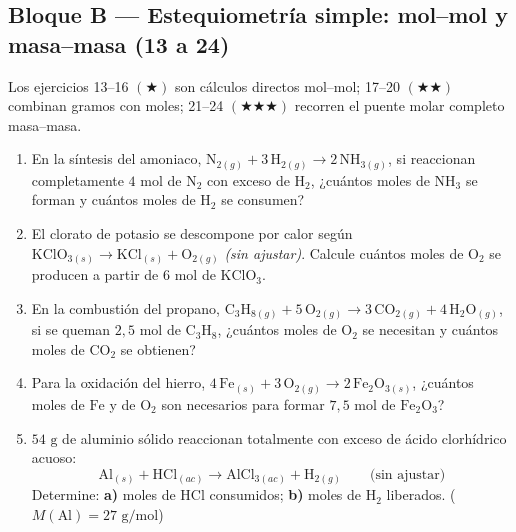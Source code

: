 \documentclass[12pt, letterpaper]{article}
\begin{document}
\subsection{Bloque B — Estequiometría simple: mol--mol y masa--masa (13 a 24)}

\noindent Los ejercicios 13--16 $(\bigstar)$ son cálculos directos mol--mol; 17--20 $(\bigstar\bigstar)$ combinan gramos con moles; 21--24 $(\bigstar\bigstar\bigstar)$ recorren el puente molar completo masa--masa.

\begin{enumerate}[leftmargin=*, start=13]

  \item \facil{}\hspace{0.55em}En la síntesis del amoniaco, $\text{N}_{2(g)} + 3\,\text{H}_{2(g)} \longrightarrow 2\,\text{NH}_{3(g)}$, si reaccionan completamente $4\text{ mol}$ de $\text{N}_2$ con exceso de $\text{H}_2$, ¿cuántos moles de $\text{NH}_3$ se forman y cuántos moles de $\text{H}_2$ se consumen?

  \item \facil{}\hspace{0.55em}El clorato de potasio se descompone por calor según $\text{KClO}_{3(s)} \longrightarrow \text{KCl}_{(s)} + \text{O}_{2(g)}$ \emph{(sin ajustar)}. Calcule cuántos moles de $\text{O}_2$ se producen a partir de $6\text{ mol}$ de $\text{KClO}_3$.

  \item \facil{}\hspace{0.55em}En la combustión del propano, $\text{C}_3\text{H}_{8(g)} + 5\,\text{O}_{2(g)} \longrightarrow 3\,\text{CO}_{2(g)} + 4\,\text{H}_2\text{O}_{(g)}$, si se queman $2{,}5\text{ mol}$ de $\text{C}_3\text{H}_8$, ¿cuántos moles de $\text{O}_2$ se necesitan y cuántos moles de $\text{CO}_2$ se obtienen?

  \item \facil{}\hspace{0.55em}Para la oxidación del hierro, $4\,\text{Fe}_{(s)} + 3\,\text{O}_{2(g)} \longrightarrow 2\,\text{Fe}_2\text{O}_{3(s)}$, ¿cuántos moles de $\text{Fe}$ y de $\text{O}_2$ son necesarios para formar $7{,}5\text{ mol}$ de $\text{Fe}_2\text{O}_3$?

  \item \medio{}\hspace{0.55em}$54\text{ g}$ de aluminio sólido reaccionan totalmente con exceso de ácido clorhídrico acuoso:
        \[
          \text{Al}_{(s)} + \text{HCl}_{(ac)} \longrightarrow \text{AlCl}_{3(ac)} + \text{H}_{2(g)} \qquad \text{(sin ajustar)}
        \]
        Determine: \textbf{a)} moles de $\text{HCl}$ consumidos; \textbf{b)} moles de $\text{H}_2$ liberados. ($M(\text{Al}) = 27\text{ g/mol}$)


\end{enumerate}
\end{document}

